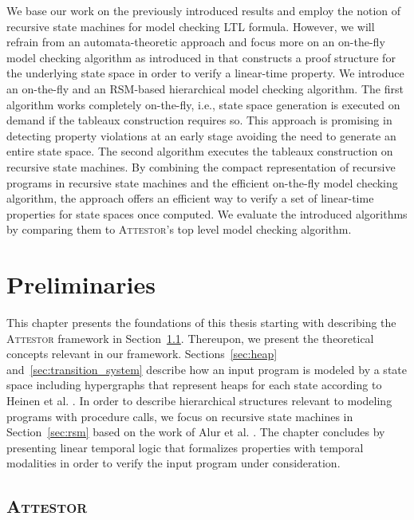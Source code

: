 \documentclass[a4paper, 12pt, twoside]{report}
\begin{document}
	We base our work on the previously introduced results and employ the notion of recursive state machines for model checking LTL formula. However, we will refrain from an automata-theoretic approach and focus more on an on-the-fly model checking algorithm as introduced in \cite{bhat1995efficient} that constructs a proof structure for the underlying state space in order to verify a linear-time property. We introduce an on-the-fly and an RSM-based hierarchical model checking algorithm. The first algorithm works completely on-the-fly, i.e., state space generation is executed on demand if the tableaux construction requires so. This approach is promising in detecting property violations at an early stage avoiding the need to generate an entire state space. The second algorithm executes the tableaux construction on recursive state machines. By combining the compact representation of recursive programs in recursive state machines and the efficient on-the-fly model checking algorithm, the approach offers an efficient way to verify a set of linear-time properties for state spaces once computed. We evaluate the introduced algorithms by comparing them to \textsc{Attestor}'s top level model checking algorithm. 
	
	\chapter{Preliminaries}\label{chp:preliminaries}
	
	This chapter presents the foundations of this thesis starting with describing the \textsc{Attestor} framework in Section~\ref{sec:attestor}. Thereupon, we present the theoretical concepts relevant in our framework. Sections~\ref{sec:heap} and~\ref{sec:transition_system} describe how an input program is modeled by a state space including hypergraphs that represent heaps for each state according to Heinen et al. \cite{heinen2015juggrnaut}. In order to describe hierarchical structures relevant to modeling programs with procedure calls, we focus on recursive state machines in Section~\ref{sec:rsm} based on the work of Alur et al. \cite{alur2001analysis}. The chapter concludes by presenting linear temporal logic that formalizes properties with temporal modalities in order to verify the input program under consideration.
	
	\section{\textsc{Attestor}}\label{sec:attestor}
	
\end{document}
